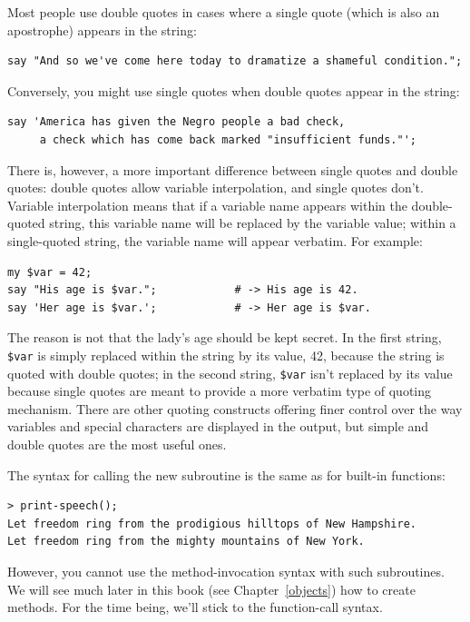 Most people use double quotes in cases where a single 
quote (which is also an apostrophe) appears in the string:
\begin{verbatim}
say "And so we've come here today to dramatize a shameful condition.";
\end{verbatim}
%
Conversely, you might use single quotes when double quotes 
appear in the string:
\begin{verbatim}
say 'America has given the Negro people a bad check, 
     a check which has come back marked "insufficient funds."';
\end{verbatim}
%
There is, however, a more important difference between single quotes 
and double quotes: double quotes allow variable interpolation, and 
single quotes don't.  Variable interpolation means that if a 
variable name appears within the double-quoted string, this 
variable name will be replaced by the variable value; within a 
single-quoted string, the variable name will appear verbatim. 
For example:
%
\begin{verbatim}
my $var = 42;
say "His age is $var.";            # -> His age is 42.
say 'Her age is $var.';            # -> Her age is $var.
\end{verbatim}
%
The reason is not that the lady's age should be kept secret. 
In the first string, \verb'$var' is simply replaced within the 
string by its value, 42, because the string is quoted with double 
quotes; in the second string, \verb'$var' isn't replaced by 
its value because single 
quotes are meant to provide a more verbatim type of quoting 
mechanism. There are other quoting constructs offering finer 
control over the way variables and special characters are 
displayed in the output, but simple and double quotes are the most 
useful ones.

The syntax for calling the new subroutine is the same as
for built-in functions:

\begin{verbatim}
> print-speech();
Let freedom ring from the prodigious hilltops of New Hampshire.
Let freedom ring from the mighty mountains of New York.
\end{verbatim}
%

However, you cannot use the method-invocation syntax with 
such subroutines. We will see much later in this book (see 
Chapter~\ref{objects}) how to create methods. For the time 
being, we'll stick to the function-call syntax.

